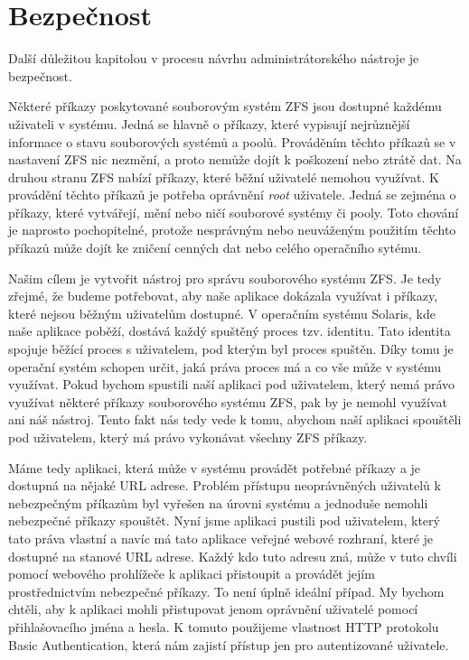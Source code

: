 \section{Bezpečnost}
Další důležitou kapitolou v procesu návrhu administrátorského nástroje je bezpečnost.

Některé příkazy poskytované souborovým systém ZFS jsou dostupné každému uživateli v systému. Jedná se hlavně o příkazy, které vypisují nejrůznější informace o stavu souborových systémů a poolů. Prováděním těchto příkazů se v nastavení ZFS nic nezmění, a proto nemůže dojít k poškození nebo ztrátě dat. Na druhou stranu ZFS nabízí příkazy, které běžní uživatelé nemohou využívat. K provádění těchto příkazů je potřeba oprávnění \emph{root} uživatele. Jedná se zejména o příkazy, které vytvářejí, mění nebo ničí souborové systémy či pooly. Toto chování je naprosto pochopitelné, protože nesprávným nebo neuváženým použitím těchto příkazů může dojít ke zničení cenných dat nebo celého operačního sytému.

Našim cílem je vytvořit nástroj pro správu souborového systému ZFS. Je tedy zřejmé, že budeme potřebovat, aby naše aplikace dokázala využívat i příkazy, které nejsou běžným uživatelům dostupné. V operačním systému Solaris, kde naše aplikace poběží, dostává každý spuštěný proces tzv. identitu. Tato identita spojuje běžící proces s uživatelem, pod kterým byl proces spuštěn. Díky tomu je operační systém schopen určit, jaká práva proces má a co vše může v systému využívat. Pokud bychom spustili naší aplikaci pod uživatelem, který nemá právo využívat některé příkazy souborového systému ZFS, pak by je nemohl využívat ani náš nástroj. Tento fakt nás tedy vede k tomu, abychom naší aplikaci spouštěli pod uživatelem, který má právo vykonávat všechny ZFS příkazy.

Máme tedy aplikaci, která může v systému provádět potřebné příkazy a je dostupná na nějaké URL adrese. Problém přístupu neoprávněných uživatelů k nebezpečným příkazům byl vyřešen na úrovni systému a jednoduše nemohli nebezpečné příkazy spouštět. Nyní jsme aplikaci pustili pod uživatelem, který tato práva vlastní a navíc má tato aplikace veřejné webové rozhraní, které je dostupné na stanové URL adrese. Každý kdo tuto adresu zná, může v tuto chvíli pomocí webového prohlížeče k aplikaci přistoupit a provádět jejím prostřednictvím nebezpečné příkazy. To není úplně ideální případ. My bychom chtěli, aby k aplikaci mohli přistupovat jenom oprávnění uživatelé pomocí přihlašovacího jména a hesla. K tomuto použijeme vlastnost HTTP protokolu Basic Authentication, která nám zajistí přístup jen pro autentizované uživatele.

